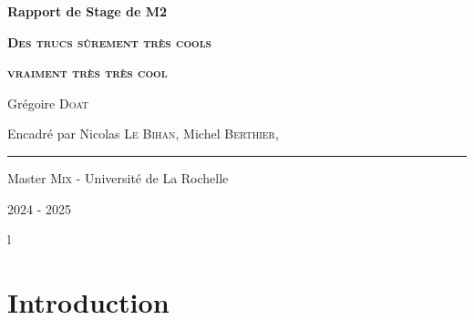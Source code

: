 





\begin{titlepage}
	
	\centering
	\vspace{1.5cm}
	{\huge\textbf{Rapport de Stage de M2}}\par
	
	\vspace{2cm}
	{\huge\textbf{\textsc{Des trucs sûrement très cools}}}\par 
	\vspace{0.5cm}
	
	{\huge\textbf{\textsc{vraiment très très cool}}}\par
	\vspace{2.0cm}
	
	{\large Grégoire \textsc{Doat}}\par
	\vspace{0.5cm}
	\vfill
	
	{\large Encadré par Nicolas \textsc{Le Bihan},  Michel \textsc{Berthier}, \etal}\par
	\vspace{0.5cm}
	
	\rule{10cm}{0.4pt}\par
	\vspace{0.7cm}
	
	{Master \textsc{Mix} - Université de La Rochelle}\par
	\vspace{0.25cm}
	
	{\large 2024 - 2025}
\end{titlepage}

\newpage
\tableofcontents
\thispagestyle{empty}
{\color{white}l}


\newpage
\setcounter{page}{1}



\newpage

{}
\section*{Introduction}

